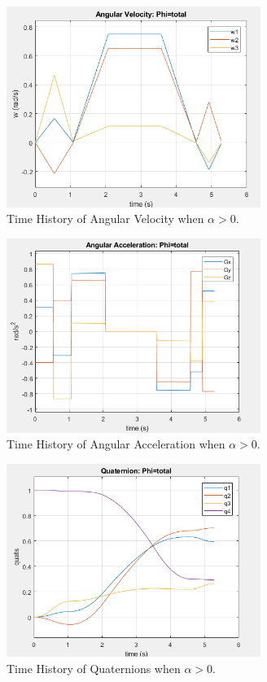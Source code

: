 \documentclass[letterpaper, preprint, paper,11pt]{AAS}	%
\begin{document}
			\begin{figure}[H]
				\label{fig:ang_vel_phi_total}
				\begin{center}
				\includegraphics[width=3.25in]{figures/alphaNot0/ang_vel_phi_total.png}
				\end{center}
				\caption{Time History of Angular Velocity when $\alpha>0$.}
			\end{figure}
		
		
			\begin{figure}[H]
				\label{fig:ang_accel_total}
				\begin{center}
					\includegraphics[width=3.25in]{figures/alphaNot0/ang_accel_total.png}
				\end{center}
				\caption{Time History of Angular Acceleration when $\alpha>0$.}
			\end{figure}
		
			\begin{figure}[H]
				\label{fig:quats_phi_total}
				\begin{center}
				\includegraphics[width=3.25in]{figures/alphaNot0/quats_phi_total.png}
				\end{center}
				\caption{Time History of Quaternions when $\alpha>0$.}
			\end{figure}
		
\end{document}
